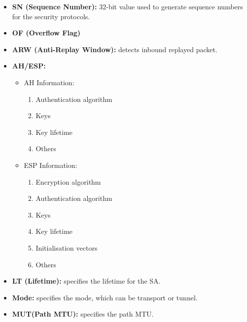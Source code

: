 \documentclass[11pt]{book}
\begin{document}
\begin{itemize}
\item \textbf{SN (Sequence Number):} 32-bit value used to generate sequence numbers for the security protocols.
\item \textbf{OF (Overflow Flag)}
\item\textbf{ ARW (Anti-Replay Window):} detects inbound replayed packet.
\item \textbf{AH/ESP:} 
	\begin{itemize}
	\item AH Information:
		\begin{enumerate}
		\item Authentication algorithm
		\item Keys
		\item Key lifetime
		\item Others
		\end{enumerate}
	\item ESP Information:
		\begin{enumerate}
		\item Encryption algorithm
		\item Authentication algorithm
		\item Keys
		\item Key lifetime
		\item Initialisation vectors
		\item Others
		\end{enumerate}
	\end{itemize}

\item \textbf{LT (Lifetime):} specifies the lifetime for the SA.
\item \textbf{Mode:} specifies the mode, which can be transport or tunnel.
\item \textbf{MUT(Path MTU):} specifies the path MTU. 
\end{itemize}
\end{document}
